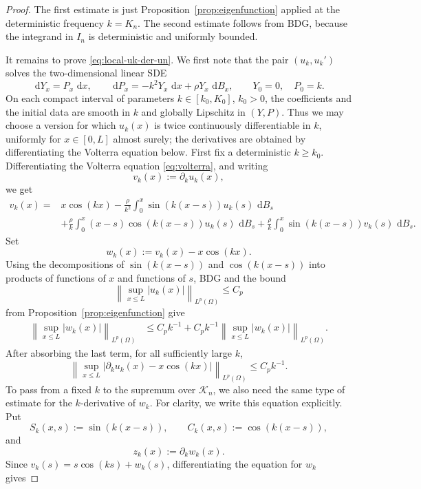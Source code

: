 \documentclass[11pt]{article}
\newcommand{\dd}{\,\mathrm d}
\begin{document}
\begin{proof}
The first estimate is just Proposition~\ref{prop:eigenfunction} applied at the deterministic frequency $k=K_n$. The second estimate follows from BDG, because the integrand in $I_n$ is deterministic and uniformly bounded.

It remains to prove \eqref{eq:local-uk-der-un}. We first note that the pair $(u_k,u_k')$ solves the two-dimensional linear SDE
\[
    \dd Y_x=P_x\,\dd x,\qquad
    \dd P_x=-k^2Y_x\,\dd x+\rho Y_x\,\dd B_x,
    \qquad Y_0=0,\quad P_0=k.
\]
On each compact interval of parameters $k\in[k_0,K_0]$, $k_0>0$, the coefficients and the initial data are smooth in $k$ and globally Lipschitz in $(Y,P)$. Thus we may choose a version for which $u_k(x)$ is twice continuously differentiable in $k$, uniformly for $x\in[0,L]$ almost surely; the derivatives are obtained by differentiating the Volterra equation below. First fix a deterministic $k\ge k_0$. Differentiating the Volterra equation \eqref{eq:volterra}, and writing
\[
    v_k(x):=\partial_k u_k(x),
\]
we get
\[
\begin{aligned}
v_k(x)
={}&x\cos(kx)
-\frac{\rho}{k^2}\int_0^x \sin(k(x-s))u_k(s)\,\dd B_s \\
&+\frac{\rho}{k}\int_0^x (x-s)\cos(k(x-s))u_k(s)\,\dd B_s
+\frac{\rho}{k}\int_0^x \sin(k(x-s))v_k(s)\,\dd B_s .
\end{aligned}
\]
Set
\[
    w_k(x):=v_k(x)-x\cos(kx).
\]
Using the decompositions of $\sin(k(x-s))$ and $\cos(k(x-s))$ into products of functions of $x$ and functions of $s$, BDG and the bound
\[
    \left\|\sup_{x\le L}|u_k(x)|\right\|_{L^p(\Omega)}\le C_p
\]
from Proposition~\ref{prop:eigenfunction} give
\[
\begin{aligned}
\left\|\sup_{x\le L}|w_k(x)|\right\|_{L^p(\Omega)}
&\le C_pk^{-1}+C_pk^{-1}
\left\|\sup_{x\le L}|w_k(x)|\right\|_{L^p(\Omega)} .
\end{aligned}
\]
After absorbing the last term, for all sufficiently large $k$,
\begin{equation}\label{eq:w-fixed-bound}
    \left\|\sup_{x\le L}|\partial_k u_k(x)-x\cos(kx)|\right\|_{L^p(\Omega)}
    \le C_pk^{-1}.
\end{equation}
To pass from a fixed $k$ to the supremum over $\mathcal K_n$, we also need the same type of estimate for the $k$-derivative of $w_k$. For clarity, we write this equation explicitly. Put
\[
    S_k(x,s):=\sin(k(x-s)),\qquad C_k(x,s):=\cos(k(x-s)),
\]
and
\[
    z_k(x):=\partial_k w_k(x).
\]
Since $v_k(s)=s\cos(ks)+w_k(s)$, differentiating the equation for $w_k$ gives


\end{proof}
\end{document}
